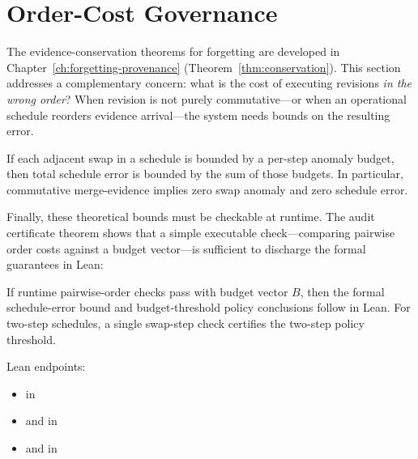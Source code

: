 \documentclass[11pt,openany]{report}
\begin{document}
\section{Order-Cost Governance}

The evidence-conservation theorems for forgetting are developed in
Chapter~\ref{ch:forgetting-provenance} (Theorem~\ref{thm:conservation}).
This section addresses a complementary concern: what is the cost of
executing revisions \emph{in the wrong order}?  When revision is not
purely commutative---or when an operational schedule reorders evidence
arrival---the system needs bounds on the resulting error.

\begin{theorem}
If each adjacent swap in a schedule is bounded by a per-step anomaly budget,
then total schedule error is bounded by the sum of those budgets.  In
particular, commutative merge-evidence implies zero swap anomaly and zero
schedule error.
\end{theorem}

Finally, these theoretical bounds must be checkable at runtime.  The
audit certificate theorem shows that a simple executable check---comparing
pairwise order costs against a budget vector---is sufficient to
discharge the formal guarantees in Lean:

\begin{theorem}
If runtime pairwise-order checks pass with budget vector $B$, then the
formal schedule-error bound and budget-threshold policy conclusions follow
in Lean.  For two-step schedules, a single swap-step check certifies the
two-step policy threshold.
\end{theorem}

Lean endpoints:
\begin{itemize}
\item {} in
\item {} and
   in
\item {} and
   in
\end{itemize}
\end{document}
